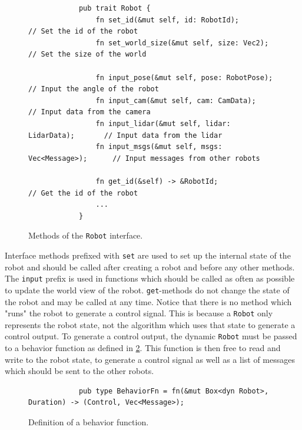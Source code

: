 \begin{figure}[H]
    \begin{center}
        \begin{verbatim}
            pub trait Robot {
                fn set_id(&mut self, id: RobotId);                 // Set the id of the robot
                fn set_world_size(&mut self, size: Vec2);          // Set the size of the world

                fn input_pose(&mut self, pose: RobotPose);         // Input the angle of the robot
                fn input_cam(&mut self, cam: CamData);             // Input data from the camera
                fn input_lidar(&mut self, lidar: LidarData);       // Input data from the lidar
                fn input_msgs(&mut self, msgs: Vec<Message>);      // Input messages from other robots

                fn get_id(&self) -> &RobotId;                      // Get the id of the robot
                ...
            }
        \end{verbatim}
    \end{center}
    \caption{Methods of the \texttt{Robot} interface.}\label{fig:robot-interface}
\end{figure}

Interface methods prefixed with \texttt{set} are used to set up the internal state of the robot and should be called after creating a robot and before any other methods. The \texttt{input} prefix is used in functions which should be called as often as possible to update the world view of the robot. \texttt{get}-methods do not change the state of the robot and may be called at any time. Notice that there is no method which "runs" the robot to generate a control signal. This is because a \texttt{Robot} only represents the robot state, not the algorithm which uses that state to generate a control output. To generate a control output, the dynamic \texttt{Robot} must be passed to a behavior function as defined in \cref{fig:behavior-fn}. This function is then free to read and write to the robot state, to generate a control signal as well as a list of messages which should be sent to the other robots.

\begin{figure}[H]
    \begin{center}
        \begin{verbatim}
            pub type BehaviorFn = fn(&mut Box<dyn Robot>, Duration) -> (Control, Vec<Message>);
        \end{verbatim}
    \end{center}
    \caption{Definition of a behavior function.}\label{fig:behavior-fn}
\end{figure}

